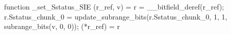 function _set_Sstatus_SIE (r_ref, v) = {
    r = __bitfield_deref(r_ref);
    r.Sstatus_chunk_0 = update_subrange_bits(r.Sstatus_chunk_0, 1, 1, subrange_bits(v, 0, 0));
    (*r_ref) = r
}
